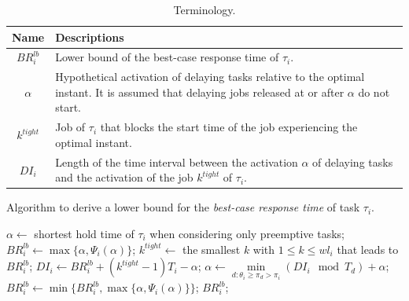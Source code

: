 \documentclass[fleqn]{article}
\begin{document}
\begin{table}[H]
	\center
	\caption{Terminology.}
	\label{tab:terminology_br}
	\begin{tabular}{|c | p{11cm}|}
		\hline
		Name & Descriptions \\ 
		\hline 
		\hline
		$BR^{lb}_i$& Lower bound of the best-case response time of $\tau_i$.\\
		\hline
		$\alpha$& Hypothetical activation of delaying tasks relative to the optimal instant. It is assumed that delaying jobs released at or after $\alpha$ do not start.\\
		\hline
		$k^{tight}$& Job of $\tau_i$ that blocks the start time of the job experiencing the optimal instant.\\
		\hline
		$DI_i$& Length of the time interval between the activation $\alpha$ of delaying tasks and the activation of the job $k^{tight}$ of $\tau_i$.\\
		\hline 
	\end{tabular}
\end{table} 


\begin{algorithm}[H]
	\caption{Algorithm to derive a lower bound for the \textit{best-case response time} of task $\tau_i$.}\label{euclid}
	\begin{algorithmic}[1]
		\State $\alpha \gets$ shortest hold time of $\tau_i$ when considering only preemptive tasks;
		\State $BR^{lb}_i \gets \max\{\alpha, \Psi_i(\alpha) \}$;
		\State $k^{tight} \gets$ the smallest $k$ with $1 \leq k \leq wl_i$ that leads to $BR^{lb}_i$;
		\State $DI_i \gets BR^{lb}_i + (k^{tight}-1)T_i - \alpha$;
		\State $\alpha \gets \min \limits_{d:\theta_i \geq \pi_d > \pi_i} (DI_i \mod T_d) + \alpha$;
		\State $BR^{lb}_i \gets \min \{BR^{lb}_i, \max\{\alpha, \Psi_i(\alpha) \}\}$;
		\State \Return $BR^{lb}_i$; 
		\EndProcedure
	\end{algorithmic}
\end{algorithm}
\end{document}
